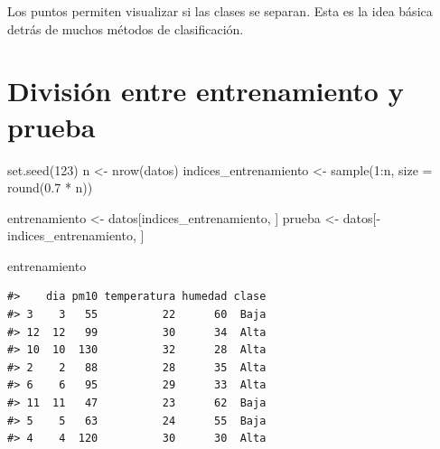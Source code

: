 \documentclass[
  spanish,
  10.5pt,
  letterpaper,
  openany,
  headings=big]{scrbook}
\newenvironment{Shaded}{}{}
\newcommand{\AttributeTok}[1]{\textcolor[rgb]{0.84,0.23,0.29}{#1}}
\newcommand{\DecValTok}[1]{\textcolor[rgb]{0.00,0.36,0.77}{#1}}
\newcommand{\FloatTok}[1]{\textcolor[rgb]{0.00,0.36,0.77}{#1}}
\newcommand{\FunctionTok}[1]{\textcolor[rgb]{0.44,0.26,0.76}{#1}}
\newcommand{\NormalTok}[1]{\textcolor[rgb]{0.14,0.16,0.18}{#1}}
\newcommand{\OtherTok}[1]{\textcolor[rgb]{0.44,0.26,0.76}{#1}}
\newcommand{\SpecialCharTok}[1]{\textcolor[rgb]{0.00,0.36,0.77}{#1}}
\begin{document}
\begin{tcolorbox}[enhanced jigsaw, arc=.35mm, bottomrule=.15mm, bottomtitle=1mm, breakable, colback=white, colbacktitle=quarto-callout-tip-color!10!white, colframe=quarto-callout-tip-color-frame, coltitle=black, left=2mm, leftrule=.75mm, opacityback=0, opacitybacktitle=0.6, rightrule=.15mm, title=\textcolor{quarto-callout-tip-color}{\faLightbulb}\hspace{0.5em}{Interpretación del resultado}, titlerule=0mm, toprule=.15mm, toptitle=1mm]

Los puntos permiten visualizar si las clases se separan. Esta es la idea
básica detrás de muchos métodos de clasificación.

\end{tcolorbox}

\section{División entre entrenamiento y
prueba}\label{divisiuxf3n-entre-entrenamiento-y-prueba}

\begin{Shaded}
\begin{Highlighting}[]
\FunctionTok{set.seed}\NormalTok{(}\DecValTok{123}\NormalTok{)}
\NormalTok{n }\OtherTok{\textless{}{-}} \FunctionTok{nrow}\NormalTok{(datos)}
\NormalTok{indices\_entrenamiento }\OtherTok{\textless{}{-}} \FunctionTok{sample}\NormalTok{(}\DecValTok{1}\SpecialCharTok{:}\NormalTok{n, }\AttributeTok{size =} \FunctionTok{round}\NormalTok{(}\FloatTok{0.7} \SpecialCharTok{*}\NormalTok{ n))}

\NormalTok{entrenamiento }\OtherTok{\textless{}{-}}\NormalTok{ datos[indices\_entrenamiento, ]}
\NormalTok{prueba }\OtherTok{\textless{}{-}}\NormalTok{ datos[}\SpecialCharTok{{-}}\NormalTok{indices\_entrenamiento, ]}

\NormalTok{entrenamiento}
\end{Highlighting}
\end{Shaded}

\begin{verbatim}
#>    dia pm10 temperatura humedad clase
#> 3    3   55          22      60  Baja
#> 12  12   99          30      34  Alta
#> 10  10  130          32      28  Alta
#> 2    2   88          28      35  Alta
#> 6    6   95          29      33  Alta
#> 11  11   47          23      62  Baja
#> 5    5   63          24      55  Baja
#> 4    4  120          30      30  Alta
\end{verbatim}
\end{document}
